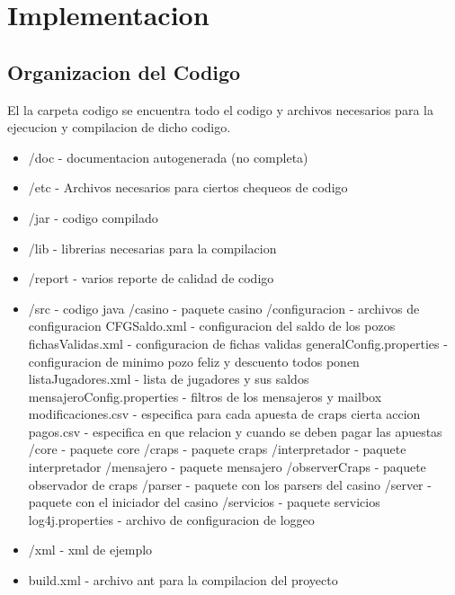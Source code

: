 \section{Implementacion}
\label{sec:Implementacion}

\subsection{Organizacion del Codigo}
\label{sec:OrganizacionDelCodigo}

El la carpeta codigo se encuentra todo el codigo y archivos necesarios para la ejecucion y compilacion de dicho codigo.

\begin{itemize}
	\item /doc - documentacion autogenerada (no  completa)
	\item /etc - Archivos necesarios para ciertos chequeos de codigo
	\item /jar - codigo compilado
	\item /lib - librerias necesarias para la compilacion
	\item /report - varios reporte de calidad de codigo
	\item /src - codigo java
		\subitem /casino - paquete casino
		\subitem /configuracion - archivos de configuracion
			\subsubitem CFGSaldo.xml - configuracion del saldo de los pozos
			\subsubitem fichasValidas.xml - configuracion de fichas validas
			\subsubitem generalConfig.properties - configuracion de minimo pozo feliz y descuento todos ponen
			\subsubitem listaJugadores.xml - lista de jugadores y sus saldos
			\subsubitem mensajeroConfig.properties - filtros de los mensajeros y mailbox
			\subsubitem modificaciones.csv - especifica para cada apuesta de craps cierta accion
			\subsubitem pagos.csv - especifica en que relacion y cuando se deben pagar las apuestas
		\subitem /core - paquete core
		\subitem /craps - paquete craps
		\subitem /interpretador - paquete interpretador
		\subitem /mensajero - paquete mensajero
		\subitem /observerCraps - paquete observador de craps
		\subitem /parser - paquete con los parsers del casino
		\subitem /server - paquete con el iniciador del casino
		\subitem /servicios - paquete servicios
		\subitem log4j.properties - archivo de configuracion de loggeo
	\item /xml - xml de ejemplo
	\item build.xml - archivo ant para la compilacion del proyecto
\end{itemize}

